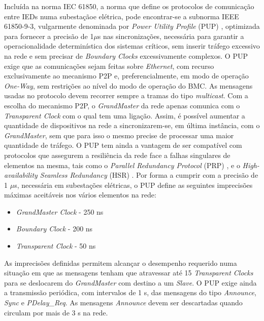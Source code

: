 \fi
Incluída na norma IEC 61850, a norma que define os protocolos de comunicação entre IEDs numa subestaçãoe elétrica, pode encontrar-se a subnorma IEEE 61850-9-3, vulgarmente denominada por \textit{Power Utility Profile} (PUP) \cite{PUP}, optimizada para fornecer a precisão de 1$\mu$s nas sincronizações, necessária para garantir a operacionalidade determinística dos sistemas críticos, sem inserir tráfego excessivo na rede e sem precisar de \textit{Boundary Clocks} excessivamente complexos.
O PUP exige que as comunicações sejam feitas sobre \textit{Ethernet}, com recurso exclusivamente ao mecanismo P2P e, preferencialmente, em modo de operação \textit{One-Way}, sem restrições ao nível do modo de operação do BMC. As mensagens usadas no protocolo devem recorrer sempre a tramas do tipo \textit{multicast}. Com a escolha do mecanismo P2P, o \textit{GrandMaster} da rede apenas comunica com o \textit{Transparent Clock} com o qual tem uma ligação. Assim, é possível aumentar a quantidade de dispositivos na rede a sincronizarem-se, em última instância, com o \textit{GrandMaster}, sem que para isso o mesmo precise de processar uma maior quantidade de tráfego. O PUP tem ainda a vantagem de ser compatível com protocolos que assegurem a resiliência da rede face a falhas singulares de elementos na mesma, tais como o \textit{Parallel Redundancy Protocol} (PRP) \cite{PRP}, e o \textit{High-availability Seamless Redundancy} (HSR) \cite{HSR}. Por forma a cumprir com a precisão de 1 $\mu$s, necessária em subestações elétricas, o PUP define as seguintes imprecisões máximas aceitáveis nos vários elementos na rede:  

\begin{itemize}
  \item \textit{GrandMaster Clock} - 250 ns
  \item \textit{Boundary Clock} - 200 ns
  \item \textit{Transparent Clock} - 50 ns
\end{itemize}

As imprecisões definidas permitem alcançar o desempenho requerido numa situação em que as mensagens tenham que atravessar até 15 \textit{Transparent Clocks} para se deslocarem do \textit{GrandMaster} com destino a um \textit{Slave}. O PUP exige ainda a transmissão periódica, com intervalos de 1 s, das mensagens do tipo \textit{Announce}, \textit{Sync} e \textit{PDelay\_Req}. As mensagens \textit{Announce} devem ser descartadas quando circulam por mais de 3 s na rede. 

\iffalse


